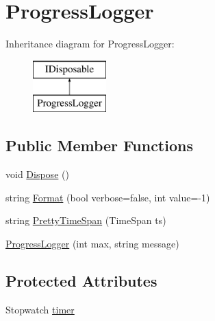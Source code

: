 \hypertarget{classOTA_1_1Logging_1_1ProgressLogger}{}\section{Progress\+Logger}
\label{classOTA_1_1Logging_1_1ProgressLogger}
Inheritance diagram for Progress\+Logger\+:\begin{figure}[H]
\begin{center}
\leavevmode
\includegraphics[height=2.000000cm]{classOTA_1_1Logging_1_1ProgressLogger}
\end{center}
\end{figure}
\subsection*{Public Member Functions}
\begin{DoxyCompactItemize}
\item 
void \hyperlink{classOTA_1_1Logging_1_1ProgressLogger_a6e2d745cdb7a7b983f861ed6a9a541a7}{Dispose} ()
\item 
string \hyperlink{classOTA_1_1Logging_1_1ProgressLogger_af2c94c62fe9842db63e3496d80d793b0}{Format} (bool verbose=false, int value=-\/1)
\item 
string \hyperlink{classOTA_1_1Logging_1_1ProgressLogger_ae0108bf6c4adff1618f92fea497eadf5}{Pretty\+Time\+Span} (Time\+Span ts)
\item 
\hyperlink{classOTA_1_1Logging_1_1ProgressLogger_ad70334a99d2ee602e759d39be99e6344}{Progress\+Logger} (int max, string message)
\end{DoxyCompactItemize}
\subsection*{Protected Attributes}
\begin{DoxyCompactItemize}
\item 
Stopwatch \hyperlink{classOTA_1_1Logging_1_1ProgressLogger_a8234ad7d375d8f81ae094686ec3b2fae}{timer}
\end{DoxyCompactItemize}
